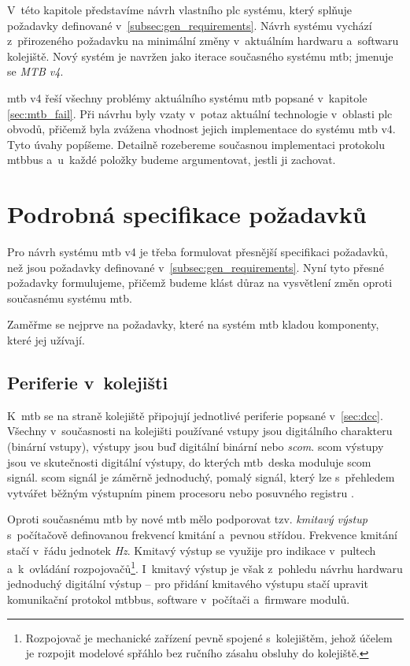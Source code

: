 V~této kapitole představíme návrh vlastního \gls{plc} systému, který
splňuje požadavky definované v~\ref{subsec:gen_requirements}. Návrh systému
vychází z~přirozeného požadavku na minimální změny v~aktuálním hardwaru
a~softwaru kolejiště. Nový systém je navržen jako iterace současného systému
\gls{mtb}; jmenuje se \textit{MTB v4}.

\gls{mtb} v4 řeší všechny problémy aktuálního systému \gls{mtb} popsané
v~kapitole \ref{sec:mtb_fail}. Při návrhu byly vzaty v~potaz aktuální
technologie v~oblasti \gls{plc} obvodů, přičemž byla zvážena vhodnost jejich
implementace do systému \gls{mtb} v4. Tyto úvahy popíšeme. Detailně rozebereme
současnou implementaci protokolu \gls{mtbbus} a~u~každé položky budeme
argumentovat, jestli ji zachovat.

\section{Podrobná specifikace požadavků}

Pro návrh systému \gls{mtb} v4 je třeba formulovat přesnější specifikaci
požadavků, než jsou požadavky definované v~\ref{subsec:gen_requirements}. Nyní
tyto přesné požadavky formulujeme, přičemž budeme klást důraz na vysvětlení
změn oproti současnému systému \gls{mtb}.

Zaměřme se nejprve na požadavky, které na systém \gls{mtb} kladou komponenty,
které jej užívají.

\subsection{Periferie v~kolejišti}

K~\gls{mtb} se na straně kolejiště připojují jednotlivé periferie popsané
v~\ref{sec:dcc}. Všechny v~současnosti na kolejišti používané vstupy jsou
digitálního charakteru (binární vstupy), výstupy jsou buď digitální binární
nebo \textit{\gls{scom}}. \gls{scom} výstupy jsou ve skutečnosti digitální
výstupy, do kterých \gls{mtb} deska moduluje \gls{scom} signál. \gls{scom}
signál je záměrně jednoduchý, pomalý signál, který lze s~přehledem vytvářet
běžným výstupním pinem procesoru nebo posuvného registru \cite{scom-specs}.

Oproti současnému \gls{mtb} by nové \gls{mtb} mělo podporovat tzv. \textit{kmitavý
výstup} s~počítačově definovanou frekvencí kmitání a~pevnou střídou. Frekvence
kmitání stačí v~řádu jednotek \textit{Hz}. Kmitavý výstup se využije pro
indikace v~pultech a~k~ovládání rozpojovačů\footnote{Rozpojovač je mechanické
zařízení pevně spojené s~kolejištěm, jehož účelem je rozpojit modelové spřáhlo
bez ručního zásahu obsluhy do kolejiště.}. I~kmitavý výstup je však z~pohledu
návrhu hardwaru jednoduchý digitální výstup – pro přidání kmitavého výstupu
stačí upravit komunikační protokol \gls{mtbbus}, software v~počítači a~firmware
modulů.


